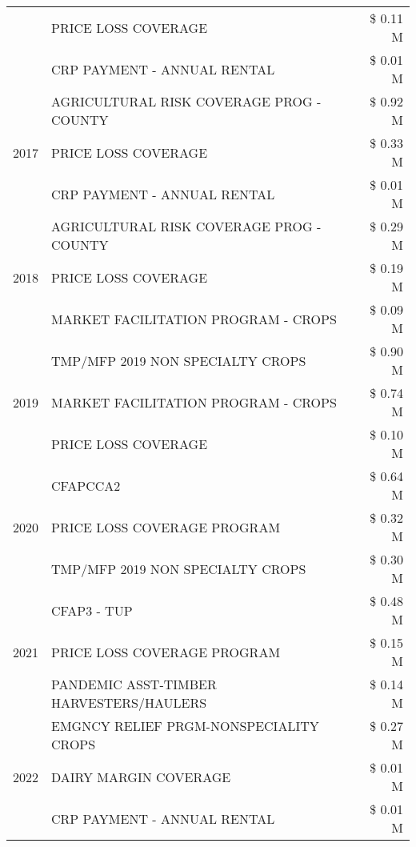 \begin{tabular}{llr}
 & PRICE LOSS COVERAGE & \$ 0.11 M \\
 & CRP PAYMENT - ANNUAL RENTAL & \$ 0.01 M \\
\cline{1-3}
\multirow[t]{3}{*}{2017} & AGRICULTURAL RISK COVERAGE PROG - COUNTY & \$ 0.92 M \\
 & PRICE LOSS COVERAGE & \$ 0.33 M \\
 & CRP PAYMENT - ANNUAL RENTAL & \$ 0.01 M \\
\cline{1-3}
\multirow[t]{3}{*}{2018} & AGRICULTURAL RISK COVERAGE PROG - COUNTY & \$ 0.29 M \\
 & PRICE LOSS COVERAGE & \$ 0.19 M \\
 & MARKET FACILITATION PROGRAM - CROPS & \$ 0.09 M \\
\cline{1-3}
\multirow[t]{3}{*}{2019} & TMP/MFP 2019 NON SPECIALTY CROPS & \$ 0.90 M \\
 & MARKET FACILITATION PROGRAM - CROPS & \$ 0.74 M \\
 & PRICE LOSS COVERAGE & \$ 0.10 M \\
\cline{1-3}
\multirow[t]{3}{*}{2020} & CFAPCCA2 & \$ 0.64 M \\
 & PRICE LOSS COVERAGE PROGRAM & \$ 0.32 M \\
 & TMP/MFP 2019 NON SPECIALTY CROPS & \$ 0.30 M \\
\cline{1-3}
\multirow[t]{3}{*}{2021} & CFAP3 - TUP & \$ 0.48 M \\
 & PRICE LOSS COVERAGE PROGRAM & \$ 0.15 M \\
 & PANDEMIC ASST-TIMBER HARVESTERS/HAULERS & \$ 0.14 M \\
\cline{1-3}
\multirow[t]{3}{*}{2022} & EMGNCY RELIEF PRGM-NONSPECIALITY CROPS & \$ 0.27 M \\
 & DAIRY MARGIN COVERAGE & \$ 0.01 M \\
 & CRP PAYMENT - ANNUAL RENTAL & \$ 0.01 M \\
\cline{1-3}
\bottomrule
\end{tabular}
